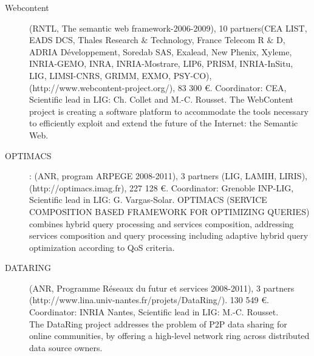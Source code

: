 \begin{description}

\item[Webcontent] (RNTL, The semantic web framework-2006-2009), 10 partners(CEA LIST, EADS DCS, Thales Research  $\&$ Technology, France Telecom R  $\&$ D, ADRIA D{\'e}veloppement, Soredab SAS, Exalead, New Phenix, Xyleme, INRIA-GEMO, INRA, INRIA-Mostrare, LIP6, PRISM, INRIA-InSitu, LIG, LIMSI-CNRS, GRIMM, EXMO, PSY-CO), \\
(http://www.webcontent-project.org/), 83 300 \euro. Coordinator: CEA, Scientific lead in LIG: Ch. Collet and M.-C. Rousset. 
The WebContent project is creating a software platform to accommodate the tools necessary to efficiently exploit and extend the future of the Internet: the Semantic Web. 

\item[OPTIMACS]: (ANR, program ARPEGE 2008-2011), 3 partners (LIG, LAMIH, LIRIS),  \\
(http://optimacs.imag.fr), 227 128 \euro. Coordinator: Grenoble INP-LIG, Scientific lead in LIG: G. Vargas-Solar. OPTIMACS (SERVICE COMPOSITION BASED FRAMEWORK FOR OPTIMIZING QUERIES) combines hybrid query processing and services composition, addressing services composition and query processing including adaptive hybrid query optimization according to QoS criteria. 

\item[DATARING] (ANR, Programme R{\'e}seaux du futur et services 2008-2011), 3 partners \\
(http://www.lina.univ-nantes.fr/projets/DataRing/). 130 549 \euro. Coordinator: INRIA Nantes, Scientific lead in LIG: M.-C. Rousset. \\
The DataRing project addresses the problem of P2P data sharing for online communities, by offering a high-level network ring across distributed data source owners. 


\end{description}
